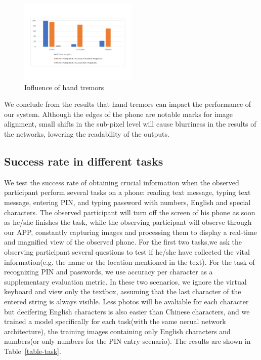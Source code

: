 \begin{figure}
 \centering
    \includegraphics[width=0.5\textwidth]{./pic/table5.pdf}
\caption{Influence of hand tremors}
\label{table-tremor}
\end{figure}

We conclude from the results that hand tremors can impact the performance of our system. Although the edges of the phone are notable marks for image alignment, small shifts in the sub-pixel level will cause blurriness in the results of the networks, lowering the readability of the outputs. 

\subsection{Success rate in different tasks}
We test the success rate of obtaining crucial information when the observed participant perform several tasks on a phone: reading text message, typing text message, entering PIN, and typing password with numbers, English and special characters. The observed participant will turn off the screen of his phone as soon as he/she finishes the task, while the observing participant will observe through our APP, constantly capturing images and processing them to display a real-time and magnified view of the observed phone. For the first two tasks,we ask the observing participant several questions to test if he/she have collected the vital information(e.g. the name or the location mentioned in the text). For the task of recognizing PIN and passwords, we use accuracy per character as a supplementary evaluation metric. In these two scenarios, we ignore the virtual keyboard and view only the textbox, assuming that the last character of the entered string is always visible. Less photos will be avaliable for each character but decifering English characters is also easier than Chinese characters, and we trained a model specifically for each task(with the same nerual network architecture), the training images containing only English characters and numbers(or only numbers for the PIN entry scenario). The results are shown in Table~\ref{table-task}.

